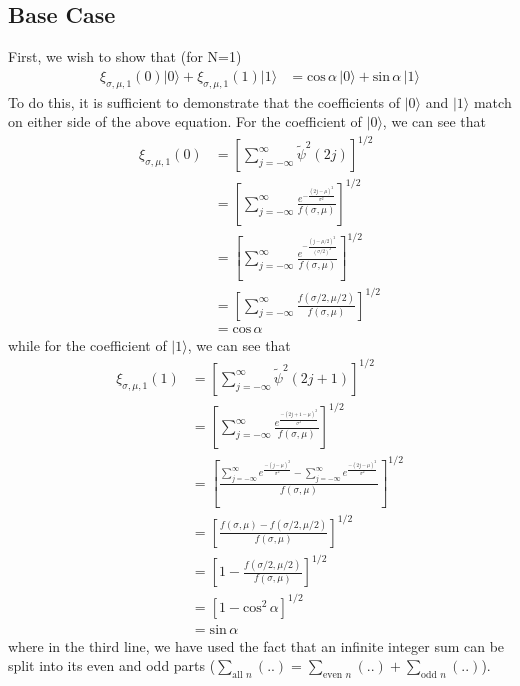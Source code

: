 \documentclass[11pt]{article}
\begin{document}
\subsection*{Base Case}
First, we wish to show that (for N=1)
\begin{align*}
\xi_{\sigma, \mu, 1} (0) \vert 0 \rangle + \xi_{\sigma, \mu, 1} (1) \vert 1 \rangle &= \text{cos}\,  \alpha \, \vert 0 \rangle + \text{sin}\,  \alpha \, \vert 1 \rangle
\end{align*}
To do this, it is sufficient to demonstrate that the coefficients of $\vert 0 \rangle$ and $\vert 1 \rangle$ match on either side of the above equation. For the coefficient of $\vert 0 \rangle$, we can see that
\begin{align*}
\xi_{\sigma, \mu, 1} (0) &= \left[ \sum_{j=-\infty}^{\infty} \tilde{\psi}^{2} (2j) \right]^{1/2} \\
&= \left[ \sum_{j=-\infty}^{\infty} \frac{e^{-\frac{(2j - \mu)^2}{\sigma^2}}}{f(\sigma, \mu)} \right]^{1/2} \\
&= \left[ \sum_{j=-\infty}^{\infty} \frac{e^{-\frac{(j - \mu/2)^2}{(\sigma/2)^2}}}{f(\sigma, \mu)} \right]^{1/2} \\
&= \left[ \sum_{j=-\infty}^{\infty} \frac{f(\sigma/2, \mu/2)}{f(\sigma, \mu)} \right]^{1/2} \\
&= \text{cos} \, \alpha
\end{align*}
while for the coefficient of $\vert 1 \rangle$, we can see that
\begin{align*}
\xi_{\sigma, \mu, 1} (1) &= \left[ \sum_{j=-\infty}^{\infty} \tilde{\psi}^{2} (2j + 1) \right]^{1/2} \\
&= \left[ \sum_{j=-\infty}^{\infty} \frac{e^{\frac{-(2j + 1 - \mu)^2}{\sigma^2}}}{f(\sigma, \mu)} \right]^{1/2} \\
&= \left[ \frac{\sum_{j=-\infty}^{\infty} e^{\frac{-(j - \mu)^2}{\sigma^2}} - \sum_{j=-\infty}^{\infty} e^{\frac{-(2j - \mu)^2}{\sigma^2}}}{f(\sigma, \mu)}  \right]^{1/2} \\
&= \left[ \frac{f(\sigma, \mu) - f(\sigma/2, \mu/2)}{f(\sigma, \mu)} \right]^{1/2} \\
&= \left[ 1 - \frac{f(\sigma/2, \mu/2)}{f(\sigma, \mu)} \right]^{1/2} \\
&= \left[ 1 - \text{cos}^{2} \, \alpha \right]^{1/2} \\
&= \text{sin} \, \alpha
\end{align*}
where in the third line, we have used the fact that an infinite integer sum can be split into its even and odd parts ($\sum_{\text{all } n} (..) = \sum_{\text{even } n} (..) + \sum_{\text{odd } n} (..) $).
\end{document}
